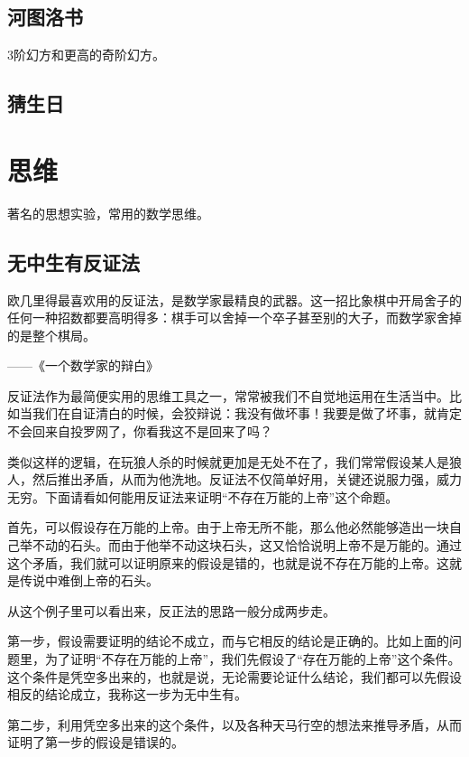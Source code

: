 \documentclass[12pt, letterpaper]{ctexrep}
\newenvironment{shadedquotation}
 {\begin{shaded*}
  \quoting[leftmargin=5pt, rightmargin=5pt, vskip=0pt]
 }
 {\endquoting
 \end{shaded*}
}
\begin{document}
\section{河图洛书}
3阶幻方和更高的奇阶幻方。


\section{猜生日}




\chapter{思维}


著名的思想实验，常用的数学思维。

\section{无中生有反证法}
\begin{shadedquotation}
\noindent
欧几里得最喜欢用的反证法，是数学家最精良的武器。这一招比象棋中开局舍子的任何一种招数都要高明得多：棋手可以舍掉一个卒子甚至别的大子，而数学家舍掉的是整个棋局。
\noindent

\noindent
——《一个数学家的辩白》
\end{shadedquotation}


反证法作为最简便实用的思维工具之一，常常被我们不自觉地运用在生活当中。比如当我们在自证清白的时候，会狡辩说：我没有做坏事！我要是做了坏事，就肯定不会回来自投罗网了，你看我这不是回来了吗？

类似这样的逻辑，在玩狼人杀的时候就更加是无处不在了，我们常常假设某人是狼人，然后推出矛盾，从而为他洗地。反证法不仅简单好用，关键还说服力强，威力无穷。下面请看如何能用反证法来证明“不存在万能的上帝”这个命题。

首先，可以假设存在万能的上帝。由于上帝无所不能，那么他必然能够造出一块自己举不动的石头。而由于他举不动这块石头，这又恰恰说明上帝不是万能的。通过这个矛盾，我们就可以证明原来的假设是错的，也就是说不存在万能的上帝。这就是传说中难倒上帝的石头。

从这个例子里可以看出来，反正法的思路一般分成两步走。

第一步，假设需要证明的结论不成立，而与它相反的结论是正确的。比如上面的问题里，为了证明“不存在万能的上帝”，我们先假设了“存在万能的上帝”这个条件。这个条件是凭空多出来的，也就是说，无论需要论证什么结论，我们都可以先假设相反的结论成立，我称这一步为无中生有。

第二步，利用凭空多出来的这个条件，以及各种天马行空的想法来推导矛盾，从而证明了第一步的假设是错误的。
\end{document}
